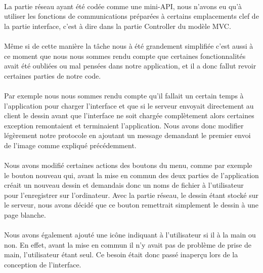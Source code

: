 \documentclass[a4paper,11pt]{article}
\begin{document}
\paragraph{}La partie réseau ayant été codée comme une mini-API, nous n'avons eu qu'à utiliser les fonctions de communications préparées à certains emplacements clef de la partie interface, c'est à dire dans la partie Controller du modèle MVC.

\paragraph{} Même si de cette manière la tâche nous à été grandement simplifiée c'est aussi à ce moment que nous nous sommes rendu compte que certaines fonctionnalités avait été oubliées ou mal pensées dans notre application, et il a donc fallut revoir certaines parties de notre code.

\paragraph{} Par exemple nous nous sommes rendu compte qu'il fallait un certain temps à l'application pour charger l'interface et que si le serveur envoyait directement au client le dessin avant que l'interface ne soit chargée complètement alors certaines exception remontaient et terminaient l'application. Nous avons donc modifier légèrement notre protocole en ajoutant un message demandant le premier envoi de l'image comme expliqué précédemment.

\paragraph{} Nous avons modifié certaines actions des boutons du menu, comme par exemple le bouton nouveau qui, avant la mise en commun des deux parties de l'application créait un nouveau dessin et demandais donc un noms de fichier à l'utilisateur pour l'enregistrer sur l'ordinateur. Avec la partie réseau, le dessin étant stocké sur le serveur, nous avons décidé que ce bouton remettrait simplement le dessin à une page blanche.

\paragraph{} Nous avons également ajouté une icône indiquant à l'utilisateur si il à la main ou non. En effet, avant la mise en commun il n'y avait pas de problème de prise de main, l'utilisateur étant seul. Ce besoin était donc passé inaperçu lors de la conception de l'interface.
\end{document}
